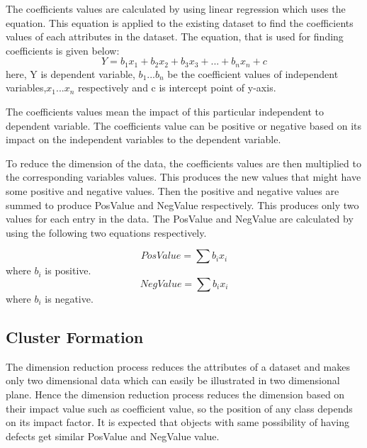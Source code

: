 \documentclass[12pt]{report}
\begin{document}
The coefficients values are calculated by using linear regression which uses the equation. This equation is applied to the existing dataset to find the coefficients values of each attributes in the dataset. The equation, that is used for finding coefficients is given below:   
\begin{equation}
\label{eq:coeffModel}
 Y=b_{1}x_{1}+b_{2}x_{2}+b_{3}x_{3}+...+b_{n}x_{n}+c
\end{equation}
here, Y is dependent variable, $b_{1}$...$b_{n}$ be the coefficient values of independent variables,$x_{1}$...$x{_n}$ respectively and c is intercept point of y-axis. 

 The coefficients values mean the impact of this particular independent to dependent variable.  The coefficients value can be positive or negative based on its impact on the independent variables to the dependent variable.
 
To reduce the dimension of the data, the coefficients values are then multiplied to the corresponding variables values. This produces the new values that might have some positive and negative values. Then the positive and negative values are summed to produce PosValue and NegValue respectively. This produces only two values for each entry in the data. The PosValue and NegValue are calculated by using the following two equations respectively. 

\begin{equation}
\label{eq:PosValue}
 PosValue=\sum{b_{i}x_{i}}
\end{equation} 
where $b_{i}$ is positive.
\begin{equation}
\label{eq:NegValue}
NegValue=\sum{b_{i}x_{i}}
\end{equation}
where $b_{i}$ is negative.


\subsection{Cluster Formation}

The dimension reduction process reduces the attributes of a dataset and makes only two dimensional data which can easily be illustrated in two dimensional plane. Hence the dimension reduction process reduces the dimension based on their impact value such as coefficient value, so the position of any class depends on its impact factor. It is expected that objects with same possibility of having defects get similar PosValue and NegValue value.
 
\end{document}
